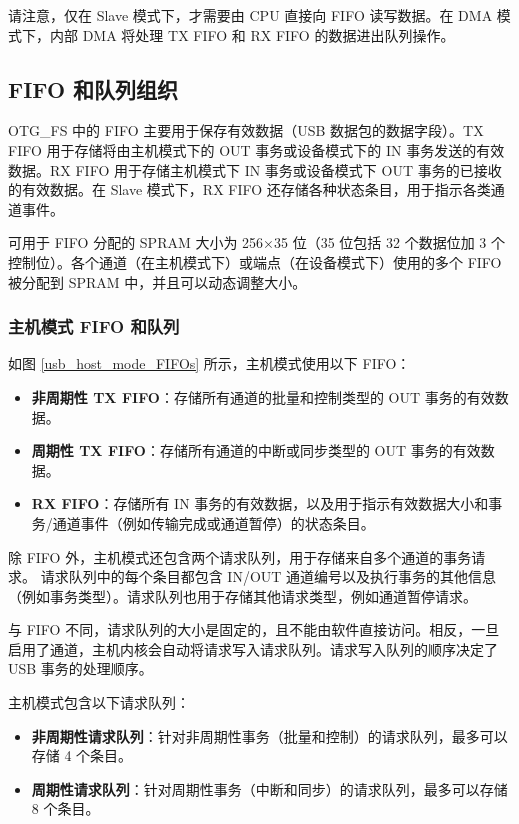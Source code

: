 \documentclass[main\_\_CN.tex]{subfiles}
\begin{document}
请注意，仅在 Slave 模式下，才需要由 CPU 直接向 FIFO 读写数据。在 DMA 模式下，内部 DMA 将处理 TX FIFO 和 RX FIFO 的数据进出队列操作。

\subsection{FIFO 和队列组织}\label{FIFO and Queue Organization}
OTG\_FS 中的 FIFO 主要用于保存有效数据（USB 数据包的数据字段）。TX FIFO 用于存储将由主机模式下的 OUT 事务或设备模式下的 IN 事务发送的有效数据。RX FIFO 用于存储主机模式下 IN 事务或设备模式下 OUT 事务的已接收的有效数据。在 Slave 模式下，RX FIFO 还存储各种状态条目，用于指示各类通道事件。

可用于 FIFO 分配的 SPRAM 大小为 256×35 位（35 位包括 32 个数据位加 3 个控制位）。各个通道（在主机模式下）或端点（在设备模式下）使用的多个 FIFO 被分配到 SPRAM 中，并且可以动态调整大小。

\subsubsection{主机模式 FIFO 和队列}

如图 \ref{usb_host_mode_FIFOs} 所示，主机模式使用以下 FIFO：

\begin{itemize}
\item {\bfseries 非周期性 TX FIFO}：存储所有通道的批量和控制类型的 OUT 事务的有效数据。
\item {\bfseries 周期性 TX FIFO}：存储所有通道的中断或同步类型的 OUT 事务的有效数据。
\item {\bfseries RX FIFO}：存储所有 IN 事务的有效数据，以及用于指示有效数据大小和事务/通道事件（例如传输完成或通道暂停）的状态条目。
\end{itemize}

除 FIFO 外，主机模式还包含两个请求队列，用于存储来自多个通道的事务请求。 请求队列中的每个条目都包含 IN/OUT 通道编号以及执行事务的其他信息（例如事务类型）。请求队列也用于存储其他请求类型，例如通道暂停请求。

与 FIFO 不同，请求队列的大小是固定的，且不能由软件直接访问。相反，一旦启用了通道，主机内核会自动将请求写入请求队列。请求写入队列的顺序决定了 USB 事务的处理顺序。

主机模式包含以下请求队列：

\begin{itemize}

\item {\bfseries 非周期性请求队列}：针对非周期性事务（批量和控制）的请求队列，最多可以存储 4 个条目。
\item {\bfseries 周期性请求队列}：针对周期性事务（中断和同步）的请求队列，最多可以存储 8 个条目。
\end{itemize}
\end{document}
